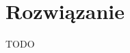 \documentclass[../main.tex]{subfiles}
\begin{document}
	
	
\section{Rozwiązanie}

TODO
\end{document}
